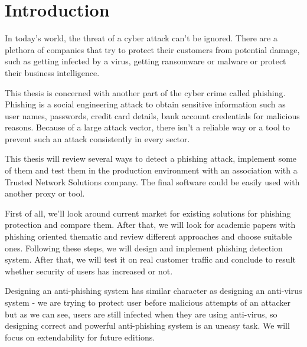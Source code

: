 \documentclass[
  digital, %
  oneside, %
  table,   %
  nolof,     %
  nolot,     %
]{fithesis3}
\begin{document}
\chapter{Introduction}

\nocite{apwg-2012-4}
\nocite{apwg-2013-1}
\nocite{apwg-2013-2}
\nocite{apwg-2013-3}
\nocite{apwg-2013-4}
\nocite{apwg-2014-1}
\nocite{apwg-2014-2}
\nocite{apwg-2014-3}
\nocite{apwg-2014-4}
\nocite{apwg-2015-1}
\nocite{apwg-2015-4}
\nocite{apwg-2016-1}
\nocite{apwg-2016-2}
\nocite{apwg-2016-3}
\nocite{apwg-2016-4}
\nocite{apwg-2017-1}
\nocite{apwg-2017-3}
\nocite{apwg-2017-4}
\nocite{apwg-2018-1}
\nocite{apwg-2018-2}
\nocite{apwg-2018-3}
\nocite{apwg-2018-4}
\nocite{apwg-2019-1}
\nocite{apwg-2019-2}

In today's world, the threat of a cyber attack can't be ignored. There are a plethora of companies that try to protect their customers from potential damage, such as getting infected by a virus, getting ransomware or malware or protect their business intelligence.

This thesis is concerned with another part of the cyber crime called phishing. Phishing is a social engineering attack to obtain sensitive information such as user names, passwords, credit card details, bank account credentials for malicious reasons.  Because of a large attack vector, there isn't a reliable way or a tool to prevent such an attack consistently in every sector.

This thesis will review several ways to detect a phishing attack, implement some of them and test them in the production environment with an association with a Trusted Network Solutions company. The final software could be easily used with another proxy or tool.

First of all, we'll look around current market for existing solutions for phishing protection and compare them. After that, we will look for academic papers with phishing oriented thematic and review different approaches and choose suitable ones. Following these steps, we will design and implement phishing detection system. After that, we will test it on real customer traffic and conclude to result whether security of users has increased or not.

Designing an anti-phishing system has similar character as designing an anti-virus system - we are trying to protect user before malicious attempts of an attacker but as we can see, users are still infected when they are using anti-virus, so designing correct and powerful anti-phishing system is an uneasy task. We will focus on extendability for future editions.
\end{document}
